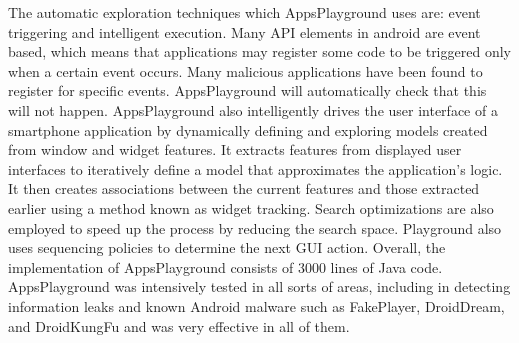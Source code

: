 \documentclass[11pt]{article}
\begin{document}
	The automatic exploration techniques which AppsPlayground uses are: event triggering and intelligent execution. Many API elements in android are event based, which means that applications may register some code to be triggered only when a certain event occurs. Many malicious applications have been found to register for specific events. AppsPlayground will automatically check that this will not happen. AppsPlayground also intelligently drives the user interface of a smartphone application by dynamically defining and exploring models created from window and widget features. It extracts features from displayed user interfaces to iteratively define a model that approximates the application’s logic. It then creates associations between the current features and those extracted earlier using a method known as widget tracking. Search optimizations are also employed to speed up the process by reducing the search space. Playground also uses sequencing policies to determine the next GUI action. Overall, the implementation of AppsPlayground consists of 3000 lines of Java code.
	AppsPlayground was intensively tested in all sorts of areas, including in detecting information leaks and known Android malware such as FakePlayer, DroidDream, and DroidKungFu and was very effective in all of them.
	
\end{document}
